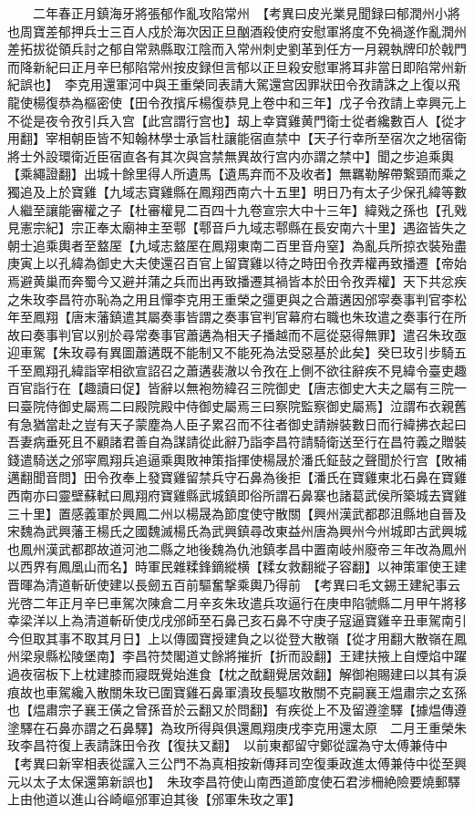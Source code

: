 　　二年春正月鎮海牙將張郁作亂攻陷常州　【考異曰皮光業見聞録曰郁潤州小將也周寶差郁押兵士三百人戍於海次因正旦酗酒殺使府安慰軍將度不免禍遂作亂潤州差拓拔從領兵討之郁自常熟縣取江陰而入常州刺史劉革到任方一月親執牌印於戟門而降新紀曰正月辛巳郁陷常州按皮録但言郁以正旦殺安慰軍將耳非當日即陷常州新紀誤也】　李克用還軍河中與王重榮同表請大駕還宫因罪狀田令孜請誅之上復以飛龍使楊復恭為樞密使【田令孜擯斥楊復恭見上卷中和三年】戊子令孜請上幸興元上不從是夜令孜引兵入宫【此宫謂行宫也】刼上幸寶雞黄門衛士從者纔數百人【從才用翻】宰相朝臣皆不知翰林學士承旨杜讓能宿直禁中【天子行幸所至宿次之地宿衛將士外設環衛近臣宿直各有其次與宫禁無異故行宫内亦謂之禁中】聞之步追乘輿【乘繩證翻】出城十餘里得人所遺馬【遺馬弃而不及收者】無羈勒解帶繋頸而乘之獨追及上於寶雞【九域志寶雞縣在鳳翔西南六十五里】明日乃有太子少保孔緯等數人繼至讓能審權之子【杜審權見二百四十九卷宣宗大中十三年】緯戣之孫也【孔戣見憲宗紀】宗正奉太廟神主至鄠【鄠音戶九域志鄠縣在長安南六十里】遇盜皆失之朝士追乘輿者至盩厔【九域志盩厔在鳳翔東南二百里音舟窒】為亂兵所掠衣裝殆盡庚寅上以孔緯為御史大夫使還召百官上留寶雞以待之時田令孜弄權再致播遷【帝始焉避黄巢而奔蜀今又避并蒲之兵而出再致播遷其禍皆本於田令孜弄權】天下共忿疾之朱玫李昌符亦恥為之用且憚李克用王重榮之彊更與之合蕭遘因邠寜奏事判官李松年至鳳翔【唐末藩鎮遣其屬奏事皆謂之奏事官判官幕府右職也朱玫遣之奏事行在所故曰奏事判官以别於尋常奏事官蕭遘為相天子播越而不扈從惡得無罪】遣召朱玫亟迎車駕【朱玫尋有異圖蕭遘既不能制又不能死為法受惡基於此矣】癸巳玫引步騎五千至鳳翔孔緯詣宰相欲宣詔召之蕭遘裴澈以令孜在上側不欲往辭疾不見緯令臺吏趣百官詣行在【趣讀曰促】皆辭以無袍笏緯召三院御史【唐志御史大夫之屬有三院一曰臺院侍御史屬焉二曰殿院殿中侍御史屬焉三曰察院監察御史屬焉】泣謂布衣親舊有急猶當赴之豈有天子蒙塵為人臣子累召而不往者御史請辦裝數日而行緯拂衣起曰吾妻病垂死且不顧諸君善自為謀請從此辭乃詣李昌符請騎衛送至行在昌符義之贈裝錢遣騎送之邠寜鳳翔兵追逼乘輿敗神策指揮使楊晟於潘氏鉦鼔之聲聞於行宫【敗補邁翻聞音問】田令孜奉上發寶雞留禁兵守石鼻為後拒【潘氏在寶雞東北石鼻在寶雞西南亦曰靈壁蘇軾曰鳳翔府寶雞縣武城鎮即俗所謂石鼻寨也諸葛武侯所築城去寶雞三十里】置感義軍於興鳳二州以楊晟為節度使守散關【興州漢武都郡沮縣地自晉及宋魏為武興藩王楊氏之國魏滅楊氏為武興鎮尋改東益州唐為興州今州城即古武興城也鳳州漢武都郡故道河池二縣之地後魏為仇池鎮孝昌中置南岐州廢帝三年改為鳳州以西界有鳳凰山而名】時軍民雜糅鋒鏑縱横【糅女救翻縱子容翻】以神策軍使王建晋暉為清道斬斫使建以長劒五百前驅奮撃乘輿乃得前　【考異曰毛文錫王建紀事云光啓二年正月辛巳車駕次陳倉二月辛亥朱玫遣兵攻逼行在庚申陷虢縣二月甲午將移幸梁洋以上為清道斬斫使戊戌邠師至石鼻己亥石鼻不守庚子寇逼寶雞辛丑車駕南引今但取其事不取其月日】上以傳國寶授建負之以從登大散嶺【從才用翻大散嶺在鳳州梁泉縣松陵堡南】李昌符焚閣道丈餘將摧折【折而設翻】王建扶掖上自煙焰中躍過夜宿板下上枕建膝而寢既覺始進食【枕之酖翻覺居效翻】解御袍賜建曰以其有淚痕故也車駕纔入散關朱玫已圍寶雞石鼻軍潰玫長驅攻散關不克嗣襄王煴肅宗之玄孫也【煴肅宗子襄王僙之曾孫音於云翻又於問翻】有疾從上不及留遵塗驛【據煴傳遵塗驛在石鼻亦謂之石鼻驛】為玫所得與俱還鳳翔庚戌李克用還太原　二月王重榮朱玫李昌符復上表請誅田令孜【復扶又翻】　以前東都留守鄭從讜為守太傅兼侍中　【考異曰新宰相表從讜入三公門不為真相按新傳拜司空復秉政進太傅兼侍中從至興元以太子太保還第新誤也】　朱玫李昌符使山南西道節度使石君涉柵絶險要燒郵驛上由他道以進山谷崎嶇邠軍迫其後【邠軍朱玫之軍】